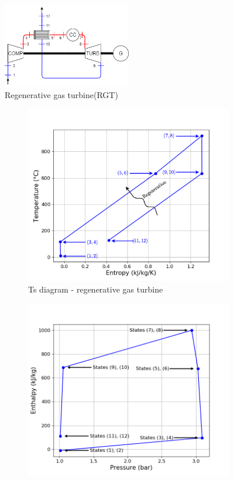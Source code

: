 \begin{figure}[h]
\centering
\includegraphics[width=0.5\textwidth]{RGT}
\caption{Regenerative gas turbine(RGT)}
\label{fig:C5_RGT}
\end{figure}
\begin{figure}[h]
     \centering
     \begin{subfigure}[b]{0.4\textwidth}
         \centering
         \includegraphics[width=\textwidth]{Ts_RGT}
         \caption{Ts diagram - regenerative gas turbine}
         \label{fig:C5_Ts_RGT}
     \end{subfigure}
     \begin{subfigure}[b]{0.4\textwidth}
         \centering
         \includegraphics[width=\textwidth]{hp_RGT}

\end{subfigure}
\end{figure}
